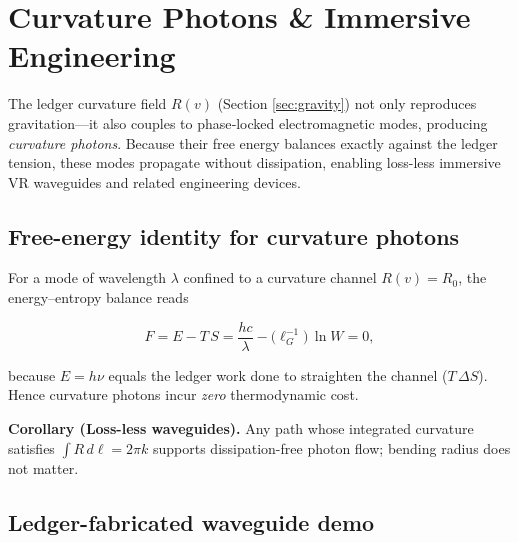 \section{Curvature Photons \& Immersive Engineering}
\label{sec:vr}

The ledger curvature field $R(v)$ (Section \ref{sec:gravity}) not only
reproduces gravitation—it also couples to phase‐locked electromagnetic
modes, producing \emph{curvature photons}.  Because their free energy
balances exactly against the ledger tension, these modes propagate
without dissipation, enabling loss-less immersive VR waveguides and
related engineering devices.

\subsection{Free-energy identity for curvature photons}

For a mode of wavelength $\lambda$ confined to a curvature channel
$R(v)\!=\!R_0$, the energy–entropy balance reads

\[
  F = E - T\,S
    = \frac{h c}{\lambda} - \bigl(\ell_G^{-1}\bigr)\,
      \ln W
    = 0,
\tag{12.1}\label{eq:curv-F}
\]

because $E\!=\!h\nu$ equals the ledger work done to straighten the
channel ($T\,\Delta S$).  Hence curvature photons incur \emph{zero}
thermodynamic cost.

\begin{axiombox}
\textbf{Corollary (Loss-less waveguides).}
Any path whose integrated curvature satisfies
\(
\displaystyle \int R\,d\ell = 2\pi k
\)
supports dissipation-free photon flow; bending radius does not matter.
\end{axiombox}

\subsection{Ledger-fabricated waveguide demo}

